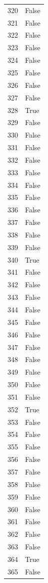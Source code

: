 \documentclass[
  letterpaper,
  DIV=11,
  numbers=noendperiod]{scrreprt}
\begin{document}
\begin{tabular}{ll}
320  &  False \\
321  &  False \\
322  &  False \\
323  &  False \\
324  &  False \\
325  &  False \\
326  &  False \\
327  &  False \\
328  &   True \\
329  &  False \\
330  &  False \\
331  &  False \\
332  &  False \\
333  &  False \\
334  &  False \\
335  &  False \\
336  &  False \\
337  &  False \\
338  &  False \\
339  &  False \\
340  &   True \\
341  &  False \\
342  &  False \\
343  &  False \\
344  &  False \\
345  &  False \\
346  &  False \\
347  &  False \\
348  &  False \\
349  &  False \\
350  &  False \\
351  &  False \\
352  &   True \\
353  &  False \\
354  &  False \\
355  &  False \\
356  &  False \\
357  &  False \\
358  &  False \\
359  &  False \\
360  &  False \\
361  &  False \\
362  &  False \\
363  &  False \\
364  &   True \\
365  &  False \\

\end{tabular}
\end{document}
